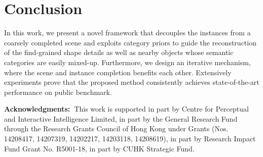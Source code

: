 \documentclass[final]{cvpr}
\begin{document}
\section{Conclusion}
\vspace{-0.2cm}
In this work, we present a novel framework that decouples the instances from a coarsely completed scene and exploits category priors to guide the reconstruction of the find-grained shape details as well as nearby objects whose semantic categories are easily mixed-up. Furthermore, we design an iterative mechanism, where the scene and instance completion benefits each other. Extensively experiments prove that the proposed method consistently achieves state-of-the-art performance on public benchmark.

\noindent \textbf{Acknowledgments:~}This work is supported in part by Centre for Perceptual and Interactive Intelligence Limited, in part by the General Research Fund through the Research Grants Council of Hong Kong under Grants (Nos. 14208417, 14207319, 14202217, 14203118, 14208619), in part by Research Impact Fund Grant No. R5001-18, in part by CUHK Strategic Fund.
\clearpage

{\small


}
\end{document}
